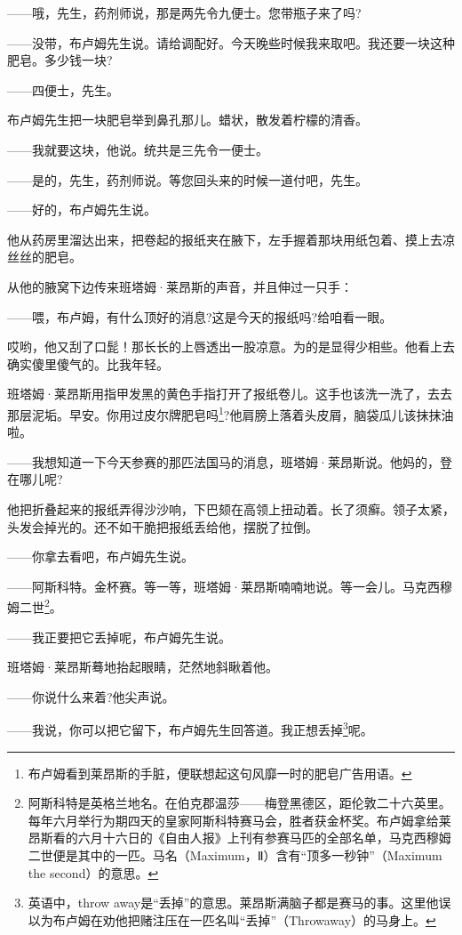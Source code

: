 \par ——哦，先生，药剂师说，那是两先令九便士。您带瓶子来了吗?
\par ——没带，布卢姆先生说。请给调配好。今天晚些时候我来取吧。我还要一块这种肥皂。多少钱一块?
\par ——四便士，先生。
\par 布卢姆先生把一块肥皂举到鼻孔那儿。蜡状，散发着柠檬的清香。
\par ——我就要这块，他说。统共是三先令一便士。
\par ——是的，先生，药剂师说。等您回头来的时候一道付吧，先生。
\par ——好的，布卢姆先生说。
\par 他从药房里溜达出来，把卷起的报纸夹在腋下，左手握着那块用纸包着、摸上去凉丝丝的肥皂。
\par 从他的腋窝下边传来班塔姆·莱昂斯的声音，并且伸过一只手：
\par ——喂，布卢姆，有什么顶好的消息?这是今天的报纸吗?给咱看一眼。
\par 哎哟，他又刮了口髭！那长长的上唇透出一股凉意。为的是显得少相些。他看上去确实傻里傻气的。比我年轻。
\par 班塔姆·莱昂斯用指甲发黑的黄色手指打开了报纸卷儿。这手也该洗一洗了，去去那层泥垢。早安。你用过皮尔牌肥皂吗\footnote{布卢姆看到莱昂斯的手脏，便联想起这句风靡一时的肥皂广告用语。}?他肩膀上落着头皮屑，脑袋瓜儿该抹抹油啦。
\par ——我想知道一下今天参赛的那匹法国马的消息，班塔姆·莱昂斯说。他妈的，登在哪儿呢?
\par 他把折叠起来的报纸弄得沙沙响，下巴颏在高领上扭动着。长了须癣。领子太紧，头发会掉光的。还不如干脆把报纸丢给他，摆脱了拉倒。
\par ——你拿去看吧，布卢姆先生说。
\par ——阿斯科特。金杯赛。等一等，班塔姆·莱昂斯喃喃地说。等一会儿。马克西穆姆二世\footnote{阿斯科特是英格兰地名。在伯克郡温莎——梅登黑德区，距伦敦二十六英里。每年六月举行为期四天的皇家阿斯科特赛马会，胜者获金杯奖。布卢姆拿给莱昂斯看的六月十六日的《自由人报》上刊有参赛马匹的全部名单，马克西穆姆二世便是其中的一匹。马名（Maximum，Ⅱ）含有“顶多一秒钟”（Maximum the second）的意思。}。
\par ——我正要把它丢掉呢，布卢姆先生说。
\par 班塔姆·莱昂斯蓦地抬起眼睛，茫然地斜瞅着他。
\par ——你说什么来着?他尖声说。
\par ——我说，你可以把它留下，布卢姆先生回答道。我正想丢掉\footnote{英语中，throw away是“丢掉”的意思。莱昂斯满脑子都是赛马的事。这里他误以为布卢姆在劝他把赌注压在一匹名叫“丢掉”（Throwaway）的马身上。}呢。
